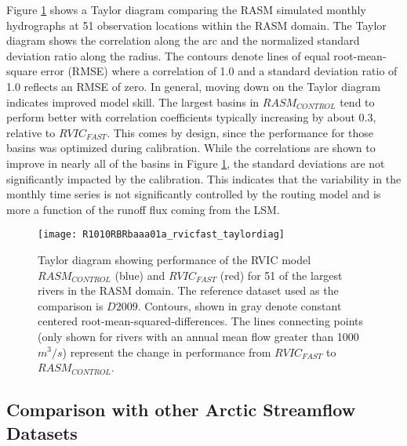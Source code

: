 Figure \ref{fig:taylor} shows a Taylor diagram comparing the RASM simulated monthly hydrographs at 51 observation locations within the RASM domain.
The Taylor diagram shows the correlation along the arc and the normalized standard deviation ratio along the radius.
The contours denote lines of equal root-mean-square error (RMSE) where a correlation of 1.0 and a standard deviation ratio of 1.0 reflects an RMSE of zero.
In general, moving down on the Taylor diagram indicates improved model skill.
The largest basins in $RASM_{CONTROL}$ tend to perform better with correlation coefficients typically increasing by about 0.3, relative to $RVIC_{FAST}$.
This comes by design, since the performance for those basins was optimized during calibration.
While the correlations are shown to improve in nearly all of the basins in Figure \ref{fig:taylor}, the standard deviations are not significantly impacted by the calibration.
This indicates that the variability in the monthly time series is not significantly controlled by the routing model and is more a function of the runoff flux coming from the LSM.

\begin{figure}
    \centering
    \texttt{[image: R1010RBRbaaa01a\_rvicfast\_taylordiag]}
    \caption{Taylor diagram showing performance of the RVIC model $RASM_{CONTROL}$ (blue) and $RVIC_{FAST}$ (red) for 51 of the largest rivers in the RASM domain.
    The reference dataset used as the comparison is $D2009$.
    Contours, shown in gray denote constant centered root-mean-squared-differences.
    The lines connecting points (only shown for rivers with an annual mean flow greater than 1000 $m^3/s$) represent the change in performance from $RVIC_{FAST}$ to $RASM_{CONTROL}$.
    }
    \label{fig:taylor}
\end{figure}

\subsection{Comparison with other Arctic Streamflow Datasets}
\label{sec:coastal_streamflow}

